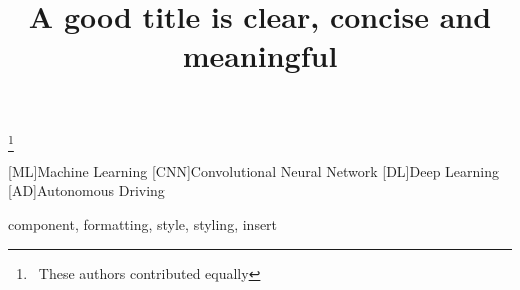 \documentclass[conference]{IEEEtran}
\newcommand\nnfootnote[1]{  %
  \begin{NoHyper}
  \renewcommand\thefootnote{}\footnote{#1}%
  \addtocounter{footnote}{-1}%
  \end{NoHyper}
}
\begin{document}


\title{A good title is clear, concise and meaningful}


\author{

}

\maketitle

\nnfootnote{\textasteriskcentered~These authors contributed equally}


\begin{acronym}
    [ML]{Machine Learning}
	[CNN]{Convolutional Neural Network}
	[DL]{Deep Learning}
	[AD]{Autonomous Driving}
\end{acronym}



\begin{abstract}

\end{abstract}


\begin{IEEEkeywords}
component, formatting, style, styling, insert
\end{IEEEkeywords}










{\small


}
\end{document}
